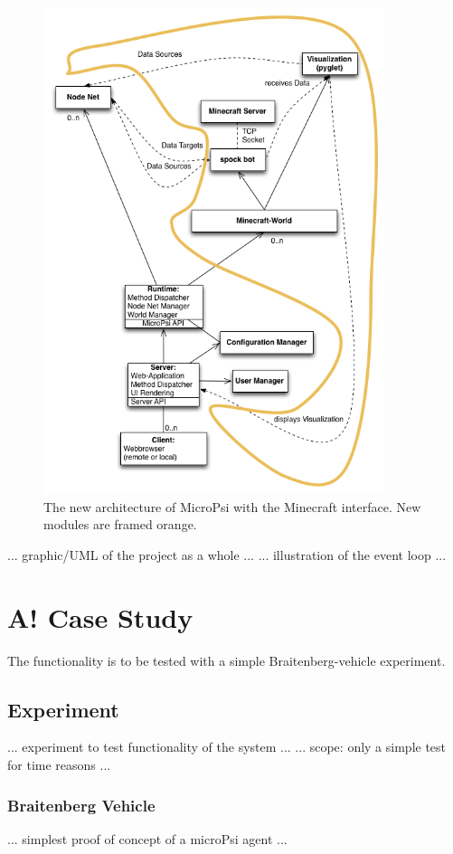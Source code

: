 \begin{figure}[h]
  \centering
    \includegraphics[width=10cm]{graphics/UML_MicroPsi_mit_spock_und_rahmen}
  \caption{The new architecture of MicroPsi with the Minecraft interface. New modules are framed orange.}
  \label{uml_mc}
\end{figure}

... graphic/UML of the project as a whole ...
... illustration of the event loop ...


\section{A! Case Study}

The functionality is to be tested with a simple Braitenberg-vehicle experiment.

\subsection{Experiment}
... experiment to test functionality of the system ...
... scope: only a simple test for time reasons ...

\subsubsection{Braitenberg Vehicle}
... simplest proof of concept of a microPsi agent ...
